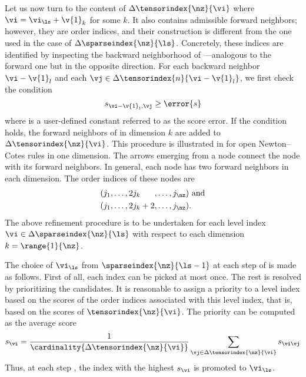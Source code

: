 Let us now turn to the content of $\Delta\tensorindex{\nz}{\vi}$ where $\vi =
\vi_{\ls} + \v{1}_k$ for some $k$. It also contains admissible forward
neighbors; however, they are order indices, and their construction is different
from the one used in the case of $\Delta\sparseindex{\nz}{\ls}$. Concretely,
these indices are identified by inspecting the backward neighborhood of
\vi---analogous to the forward one but in the opposite direction. For each
backward neighbor $\vi - \v{1}_l$ and each $\vj \in \Delta\tensorindex{n}{\vi -
\v{1}_l}$, we first check the condition
\[
  s_{\vi - \v{1}_l, \vj} \geq \error{s}
\]
where  is a user-defined constant referred to as the score error. If
the condition holds, the forward neighbors of \vj in dimension $k$ are added to
$\Delta\tensorindex{\nz}{\vi}$. This procedure is illustrated in
 for open Newton--Cotes rules in one dimension. The arrows
emerging from a node connect the node with its forward neighbors. In general,
each node has two forward neighbors in each dimension. The order indices of
these nodes are
\begin{align*}
  & (j_1, \dots, 2 j_k \phantom{{} + 2}, \dots, j_{\nz}) \text{ and} \\
  & (j_1, \dots, 2 j_k + 2,              \dots, j_{\nz}).
\end{align*}
The above refinement procedure is to be undertaken for each level index $\vi \in
\Delta\sparseindex{\nz}{\ls}$ with respect to each dimension $k =
\range{1}{\nz}$.

The choice of $\vi_{\ls}$ from $\sparseindex{\nz}{\ls - 1}$ at each step \ls of
 is made as follows. First of all, each index can be picked
at most once. The rest is resolved by prioritizing the candidates. It is
reasonable to assign a priority to a level index \vi based on the scores of the
order indices associated with this level index, that is, based on the scores of
$\tensorindex{\nz}{\vi}$. The priority can be computed as the average score
\[
  s_{\vi} = \frac{1}{\cardinality{\Delta\tensorindex{\nz}{\vi}}} \sum_{\vj \in \Delta\tensorindex{\nz}{\vi}} s_{\vi \vj}
\]
Thus, at each step \ls, the index \vi with the highest $s_{\vi}$ is promoted to
$\vi_{\ls}$.

